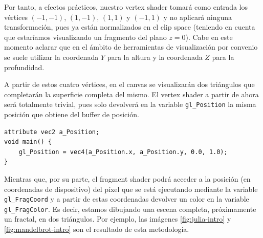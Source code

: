 Por tanto, a efectos prácticos, nuestro vertex shader tomará como entrada los vértices $(-1,-1)$, $(1,-1)$, $(1,1)$ y $(-1,1)$ y no aplicará ninguna transformación, pues ya están normalizados en el clip space (teniendo en cuenta que estaríamos visualizando un fragmento del plano $z=0$). Cabe en este momento aclarar que en el ámbito de herramientas de visualización por convenio se suele utilizar la coordenada $Y$ para la altura y la coordenada $Z$ para la profundidad. 

A partir de estos cuatro vértices, en el canvas se visualizarán dos triángulos que completarán la superficie completa del mismo. El vertex shader a partir de ahora será totalmente trivial, pues solo devolverá en la variable \verb|gl_Position| la misma posición que obtiene del buffer de posición.

\begin{lstlisting}
attribute vec2 a_Position;
void main() {
    gl_Position = vec4(a_Position.x, a_Position.y, 0.0, 1.0);
}
\end{lstlisting}

Mientras que, por su parte, el fragment shader podrá acceder a la posición (en coordenadas de dispositivo) del píxel que se está ejecutando mediante la variable \verb|gl_FragCoord| y a partir de estas coordenadas devolver un color en la variable \verb|gl_FragColor|. Es decir, estamos dibujando una escena completa, próximamente un fractal, en dos triángulos. Por ejemplo, las imágenes \ref{fig:julia-intro} y \ref{fig:mandelbrot-intro} son el resultado de esta metodología. 

